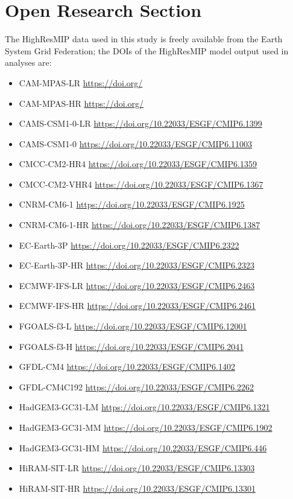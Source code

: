 \documentclass[draft]{agujournal2019}
\begin{document}
\section*{Open Research Section}
The HighResMIP data used in this study is freely available from the Earth System Grid Federation; the DOIs of the HighResMIP model output used in analyses are:
\begin{itemize}
    \item CAM-MPAS-LR \url{https://doi.org/}
    \item CAM-MPAS-HR \url{https://doi.org/}
    \item CAMS-CSM1-0-LR \url{https://doi.org/10.22033/ESGF/CMIP6.1399} %
    \item CAMS-CSM1-0 \url{https://doi.org/10.22033/ESGF/CMIP6.11003}
    \item CMCC-CM2-HR4 \url{https://doi.org/10.22033/ESGF/CMIP6.1359}
    \item CMCC-CM2-VHR4 \url{https://doi.org/10.22033/ESGF/CMIP6.1367}
    \item CNRM-CM6-1 \url{https://doi.org/10.22033/ESGF/CMIP6.1925} 
    \item CNRM-CM6-1-HR \url{https://doi.org/10.22033/ESGF/CMIP6.1387}
    \item EC-Earth-3P \url{https://doi.org/10.22033/ESGF/CMIP6.2322}
    \item EC-Earth-3P-HR \url{https://doi.org/10.22033/ESGF/CMIP6.2323}
    \item ECMWF-IFS-LR \url{https://doi.org/10.22033/ESGF/CMIP6.2463}
    \item ECMWF-IFS-HR \url{https://doi.org/10.22033/ESGF/CMIP6.2461}
    \item FGOALS-f3-L \url{https://doi.org/10.22033/ESGF/CMIP6.12001}
    \item FGOALS-f3-H \url{https://doi.org/10.22033/ESGF/CMIP6.2041}
    \item GFDL-CM4 \url{https://doi.org/10.22033/ESGF/CMIP6.1402} %
    \item GFDL-CM4C192 \url{https://doi.org/10.22033/ESGF/CMIP6.2262}
    \item HadGEM3-GC31-LM \url{https://doi.org/10.22033/ESGF/CMIP6.1321}
    \item HadGEM3-GC31-MM \url{https://doi.org/10.22033/ESGF/CMIP6.1902}
    \item HadGEM3-GC31-HM \url{https://doi.org/10.22033/ESGF/CMIP6.446}
    \item HiRAM-SIT-LR \url{https://doi.org/10.22033/ESGF/CMIP6.13303}
    \item HiRAM-SIT-HR \url{https://doi.org/10.22033/ESGF/CMIP6.13301}

\end{itemize}
\end{document}

